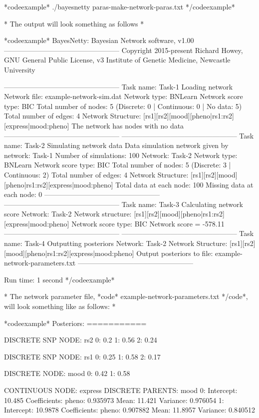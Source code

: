 *codeexample* ./bayesnetty paras-make-network-paras.txt */codeexample*

* The output will look something as follows *

*codeexample* BayesNetty: Bayesian Network software, v1.00 -------------------------------------------------- Copyright 2015-present Richard Howey, GNU General Public License, v3 Institute of Genetic Medicine, Newcastle University

-------------------------------------------------- Task name: Task-1 Loading network Network file: example-network-sim.dat Network type: BNLearn Network score type: BIC Total number of nodes: 5 (Discrete: 0 | Continuous: 0 | No data: 5) Total number of edges: 4 Network Structure: [rs1][rs2][mood][pheno|rs1:rs2][express|mood:pheno] The network has nodes with no data -------------------------------------------------- -------------------------------------------------- Task name: Task-2 Simulating network data Data simulation network given by network: Task-1 Number of simulations: 100 Network: Task-2 Network type: BNLearn Network score type: BIC Total number of nodes: 5 (Discrete: 3 | Continuous: 2) Total number of edges: 4 Network Structure: [rs1][rs2][mood][pheno|rs1:rs2][express|mood:pheno] Total data at each node: 100 Missing data at each node: 0 -------------------------------------------------- -------------------------------------------------- Task name: Task-3 Calculating network score Network: Task-2 Network structure: [rs1][rs2][mood][pheno|rs1:rs2][express|mood:pheno] Network score type: BIC Network score = -578.11 -------------------------------------------------- -------------------------------------------------- Task name: Task-4 Outputting posteriors Network: Task-2 Network Structure: [rs1][rs2][mood][pheno|rs1:rs2][express|mood:pheno] Output posteriors to file: example-network-parameters.txt --------------------------------------------------

Run time: 1 second */codeexample*

* The network parameter file, *code* example-network-parameters.txt */code*, will look something like as follows: *

*codeexample* Posteriors: ===========

DISCRETE SNP NODE: rs2
  0: 0.2
  1: 0.56
  2: 0.24

DISCRETE SNP NODE: rs1
  0: 0.25
  1: 0.58
  2: 0.17

DISCRETE NODE: mood
  0: 0.42
  1: 0.58

CONTINUOUS NODE: express
 DISCRETE PARENTS: mood
 0:
  Intercept: 10.485
  Coefficients: pheno: 0.935973
  Mean: 11.421
  Variance: 0.976054
 1:
  Intercept: 10.9878
  Coefficients: pheno: 0.907882
  Mean: 11.8957
  Variance: 0.840512

